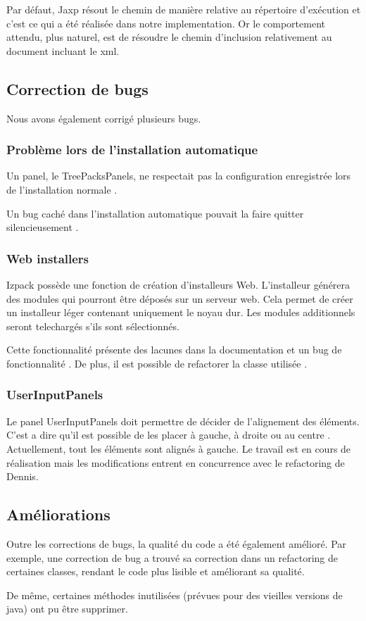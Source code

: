 Par défaut, Jaxp résout le chemin de manière relative au répertoire d'exécution et c'est ce qui a été réalisée dans notre implementation.
Or le comportement attendu, plus naturel, est de résoudre le chemin d'inclusion relativement au document incluant le xml.

\subsection{Correction de bugs}
Nous avons également corrigé plusieurs bugs.
\subsubsection{Problème lors de l'installation automatique}
Un panel, le TreePacksPanels, ne respectait pas la configuration enregistrée lors de l'installation normale \cite{IZPACK-223}.

Un bug caché dans l'installation automatique pouvait la faire quitter silencieusement \cite{IZPACK-309}.
\subsubsection{Web installers}
Izpack possède une fonction de création d'installeurs Web.
L'installeur générera des modules qui pourront être déposés sur un serveur web.
Cela permet de créer un installeur léger contenant uniquement le noyau dur.
Les modules additionnels seront telechargés s'ils sont sélectionnés.

Cette fonctionnalité présente des lacunes dans la documentation \cite{IZPACK-224} et un bug de fonctionnalité \cite{IZPACK-281}.
De plus, il est possible de refactorer la classe utilisée \cite{IZPACK-307}.
\subsubsection{UserInputPanels}
Le panel UserInputPanels doit permettre de décider de l'alignement des éléments.
C'est a dire qu'il est possible de les placer à gauche, à droite ou au centre \cite{IZPACK-176}. Actuellement, tout les éléments sont alignés à gauche.
Le travail est en cours de réalisation mais les modifications entrent en concurrence avec le refactoring de Dennis.

\subsection{Améliorations}
Outre les corrections de bugs, la qualité du code a été également amélioré. Par exemple, une correction de bug \cite{IZPACK-309} a trouvé sa correction dans un refactoring de certaines classes, rendant le code plus lisible et améliorant sa qualité.

De même, certaines méthodes inutilisées \cite{IZPACK-336} (prévues pour des vieilles versions de java) ont pu être supprimer.
